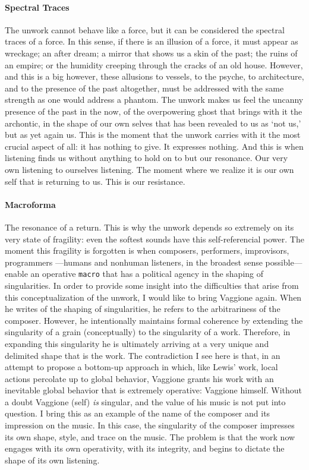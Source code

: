\paragraph{Spectral Traces}
The unwork cannot behave like a force, but it can be considered the spectral traces of a force. In this sense, if there is an illusion of a force, it must appear as wreckage; an after dream; a mirror that shows us a skin of the past; the ruins of an empire; or the humidity creeping through the cracks of an old house. However, and this is a big however, these allusions to vessels, to the psyche, to architecture, and to the presence of the past altogether, must be addressed with the same strength as one would address a phantom. The unwork makes us feel the uncanny presence of the past in the now, of the overpowering ghost that brings with it the archontic, in the shape of our own selves that has been revealed to us as `not us,' but as yet again us. This is the moment that the unwork carries with it the most crucial aspect of all: it has nothing to give. It expresses nothing. And this is when listening finds us without anything to hold on to but our resonance. Our very own listening to ourselves listening. The moment where we realize it is our own self that is returning to us. This is our resistance.

\paragraph{Macroforma}
The resonance of a return. This is why the unwork depends so extremely on its very state of fragility: even the softest sounds have this self-referencial power. The moment this fragility is forgotten is when composers, performers, improvisors, programmers ---humans and nonhuman listeners, in the broadest sense possible--- enable an operative \texttt{macro} that has a political agency in the shaping of singularities. In order to provide some insight into the difficulties that arise from this conceptualization of the unwork, I would like to bring Vaggione again. When he writes of the shaping of singularities, he refers to the arbitrariness of the composer. However, he intentionally maintains formal coherence by extending the singularity of a grain (conceptually) to the singularity of a work. Therefore, in expanding this singularity he is ultimately arriving at a very unique and delimited shape that is the work. The contradiction I see here is that, in an attempt to propose a bottom-up approach in which, like Lewis' work, local actions percolate up to global behavior, Vaggione grants his work with an inevitable global behavior that is extremely operative: Vaggione himself. Without a doubt Vaggione (self) \textit{is} singular, and the value of his music is not put into question. I bring this as an example of the name of the composer and its impression on the music. In this case, the singularity of the composer impresses its own shape, style, and trace on the music. The problem is that the work now engages with its own operativity, with its integrity, and begins to dictate the shape of its own listening.

